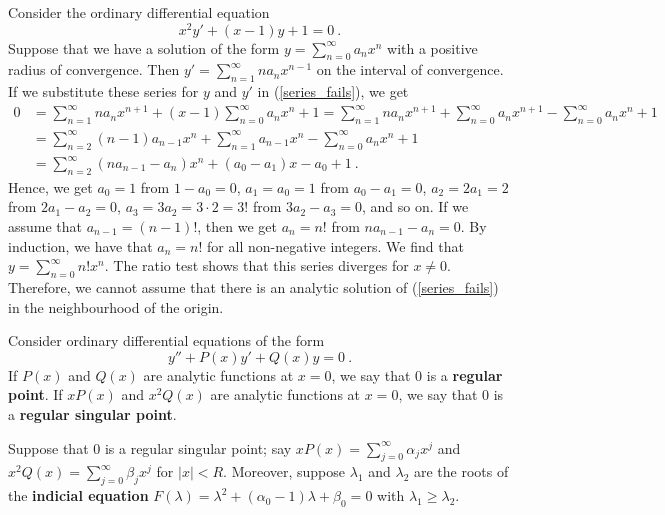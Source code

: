 \begin{egg}
Consider the ordinary differential equation
\begin{equation}\label{series_fails}
x^2 y' + (x-1)y + 1 = 0 \ .
\end{equation}
Suppose that we have a solution of the form
$\displaystyle y = \sum_{n=0}^\infty a_n x^n$ with a positive radius
of convergence.  Then
$\displaystyle y' = \sum_{n=1}^\infty n a_n x^{n-1}$ on the interval
of convergence.  If we substitute these series for $y$ and $y'$ in
(\ref{series_fails}), we get
\begin{align*}
0 &= \sum_{n=1}^\infty n a_n x^{n+1} +(x-1) \sum_{n=0}^\infty a_n x^n + 1
= \sum_{n=1}^\infty n a_n x^{n+1} + \sum_{n=0}^\infty a_n x^{n+1} -
\sum_{n=0}^\infty a_n x^n + 1 \\
&= \sum_{n=2}^\infty (n-1) a_{n-1} x^n + \sum_{n=1}^\infty a_{n-1} x^n -
\sum_{n=0}^\infty a_n x^n + 1 \\
&= \sum_{n=2}^\infty \left( n a_{n-1} - a_n\right) x^n
+ (a_0 - a_1)x - a_0 + 1 \ .
\end{align*}
Hence, we get $a_0 = 1$ from $1-a_0 = 0$,
$a_1 = a_0 = 1$ from $a_0 - a_1 = 0$,
$a_2 = 2a_1 = 2$ from $2 a_1 - a_2 = 0$,
$a_3 = 3a_2 = 3\cdot 2 = 3!$ from $3 a_2 - a_3 = 0$, and so on.
If we assume that $a_{n-1} = (n-1)!$, then we get $a_n = n!$ from
$n a_{n-1} - a_n = 0$.  By induction, we have that $a_n = n!$ for all
non-negative integers.  We find that
$\displaystyle y = \sum_{n=0}^\infty n! x^n$.  The ratio test
shows that this series diverges for $x\neq 0$.  Therefore, we cannot
assume that there is an analytic solution of (\ref{series_fails}) in
the neighbourhood of the origin.
\end{egg}

Consider ordinary differential equations of the form
\begin{equation} \label{spv_frobenius}
y'' + P(x) y' + Q(x) y = 0 \ .
\end{equation}
If $P(x)$ and $Q(x)$ are analytic functions at $x=0$, we say that
$0$ is a {\bfseries regular point}.
If $x P(x)$ and $\displaystyle x^2 Q(x)$ are analytic functions at
$x=0$, we say that $0$ is a
{\bfseries regular singular point}.

Suppose that $0$ is a regular singular point; say
$\displaystyle x P(x) = \sum_{j=0}^\infty \alpha_j x^j$ and
$\displaystyle x^2 Q(x) = \sum_{j=0}^\infty \beta_j x^j$ for $|x| < R$.
Moreover, suppose $\lambda_1$ and $\lambda_2$ are the roots of the
{\bfseries indicial equation}
$F(\lambda) = \lambda^2 + (\alpha_0 - 1) \lambda + \beta_0 = 0$
with $\lambda_1 \geq \lambda_2$.

